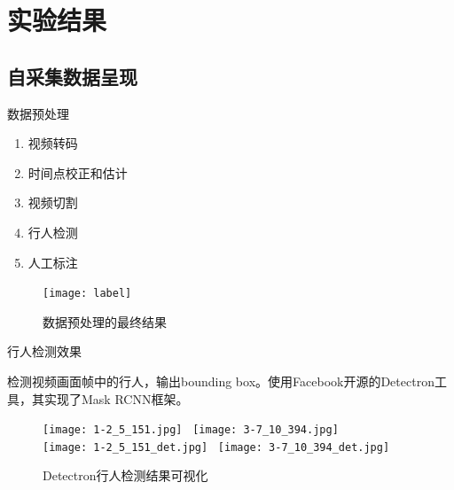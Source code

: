 \section{实验结果}

\subsection{自采集数据呈现}

\begin{frame}{数据预处理}
    \begin{block}{}
        \begin{enumerate}
            \item 视频转码
            \item 时间点校正和估计
            \item 视频切割
            \item 行人检测
            \item 人工标注
        \end{enumerate}
    \end{block}
    \begin{figure}
        \centering
        \texttt{[image: label]}
        \caption{数据预处理的最终结果}
        \label{fig:label}
    \end{figure}
\end{frame}

\begin{frame}{行人检测效果}
    \begin{block}{}
        检测视频画面帧中的行人，输出bounding box。使用Facebook开源的Detectron工具，其实现了Mask RCNN框架。
    \end{block}
    \begin{figure}
        \centering
        \texttt{[image: 1-2\_5\_151.jpg]}~
        \texttt{[image: 3-7\_10\_394.jpg]}\\
        \texttt{[image: 1-2\_5\_151\_det.jpg]}~
        \texttt{[image: 3-7\_10\_394\_det.jpg]}
        \caption{Detectron行人检测结果可视化}
        \label{fig:detectron}
    \end{figure}
\end{frame}

